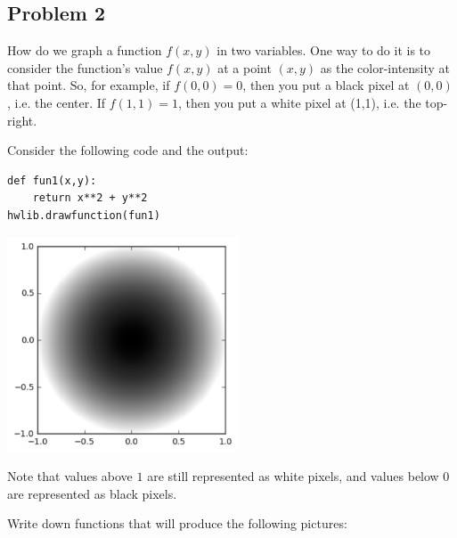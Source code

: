 \documentclass[letterpaper,11pt]{amsart}
\theoremstyle{plain}
\theoremstyle{definition}
\begin{document}
\subsection*{Problem 2} How do we graph a function $f(x,y)$ in two variables. One way to do it is to consider the function's value $f(x,y)$ at a point $(x,y)$ as the color-intensity at that point. So, for example, if $f(0,0) = 0$, then you put a black pixel at $(0,0)$, i.e. the center. If $f(1,1) = 1$, then you put a white pixel at (1,1), i.e. the top-right. 

Consider the following code and the output:

\begin{lstlisting}
def fun1(x,y):
    return x**2 + y**2
hwlib.drawfunction(fun1) 
\end{lstlisting}

\noindent\includegraphics[width=2.7in]{img0.png}

Note that values above $1$ are still represented as white pixels, and values below 0 are represented as black pixels. 

Write down functions that will produce the following pictures:
\end{document}
